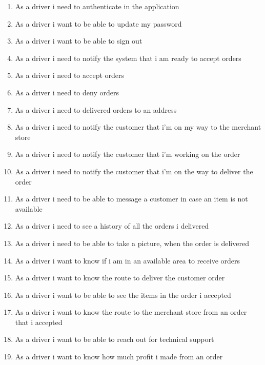 \begin{enumerate}[resume, label=USR-\arabic*]
    \item As a driver i need to authenticate in the application
    \item As a driver i want to be able to update my password
    \item As a driver i want to be able to sign out
    \item As a driver i need to notify the system that i am ready to 
    accept orders
    \item As a driver i need to accept orders
    \item As a driver i need to deny orders
    \item As a driver i need to delivered orders to an address
    \item As a driver i need to notify the customer that i’m on my way to the 
    merchant store
    \item As a driver i need to notify the customer that i’m working on the 
    order
    \item As a driver i need to notify the customer that i’m on the way to 
    deliver the order
    \item As a driver i need to be able to message a customer in case an 
    item is not available
    \item As a driver i need to see a history of all the orders i delivered
    \item As a driver i need to be able to take a picture, when the order is 
    delivered
    \item As a driver i want to know if i am in an available area to receive 
    orders
    \item As a driver i want to know the route to deliver the customer order
    \item As a driver i want to be able to see the items in the order i 
    accepted
    \item As a driver i want to know the route to the merchant store from an 
    order that i accepted
    \item As a driver i want to be able to reach out for technical support
    \item As a driver i want to know how much profit i made from an order
\end{enumerate}
\pagebreak
